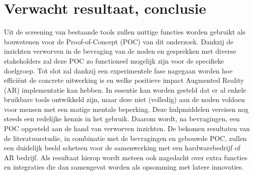 \section{Verwacht resultaat, conclusie}%
\label{sec:verwachte_resultaten}

Uit de screening van bestaande tools zullen nuttige functies worden gebruikt als bouwstenen voor de Proof-of-Concept (POC) van dit onderzoek. 
Dankzij de inzichten verworven in de bevraging van de noden en gesprekken met diverse stakeholders zal deze POC zo functioneel mogelijk zijn voor de specifieke doelgroep. 
Tot slot zal dankzij een experimentele fase nagegaan worden hoe efficiënt de concrete uitwerking is en welke positieve impact Augmented Reality (AR) implementatie kan hebben.
In essentie kan worden gesteld dat er al enkele bruikbare tools ontwikkeld zijn, maar deze niet (volledig) aan de noden voldoen voor mensen met een matige mentale beperking. Deze hulpmiddelen vereisen nog steeds een redelijke kennis in het gebruik. Daarom wordt, na bevragingen, een POC opgesteld aan de hand van verworven inzichten. De bekomen resultaten van de literatuurstudie, in combinatie met de bevragingen en gebouwde POC, zullen een duidelijk beeld schetsen voor de samenwerking met een hardwarebedrijf of AR bedrijf. 
Als resultaat hierop wordt meteen ook nagedacht over extra functies en integraties die dan samengevat worden als opsomming met latere innovaties.

